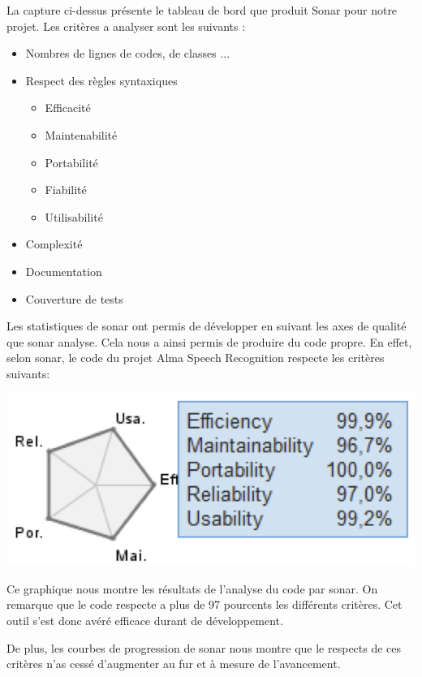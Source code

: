 La capture ci-dessus présente le tableau de bord que produit Sonar pour notre projet. Les critères a analyser sont les suivants :

\begin{itemize}
\item Nombres de lignes de codes, de classes ...
\item Respect des règles syntaxiques
	\begin{itemize}
	\item Efficacité
	\item Maintenabilité
	\item Portabilité
	\item Fiabilité
	\item Utilisabilité
	\end{itemize}
\item Complexité
\item Documentation
\item Couverture de tests
\end{itemize}


Les statistiques de sonar ont permis de développer en suivant les axes de qualité que sonar analyse. Cela nous a ainsi permis de produire du code propre. En effet, selon sonar, le code du projet Alma Speech Recognition respecte les critères suivants: 

\includegraphics{img/sonar-axes.png} 

Ce graphique nous montre les résultats de l'analyse du code par sonar. On remarque que le code respecte a plus de 97 pourcents les différents critères. Cet outil s'est donc avéré efficace durant de développement.

De plus, les courbes de progression de sonar nous montre que le respects de ces critères n'as cessé d'augmenter au fur et à mesure de l'avancement.



